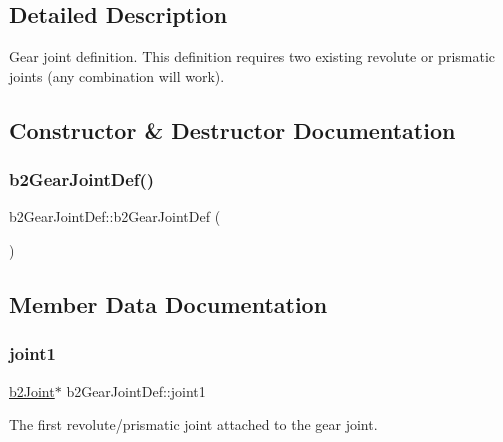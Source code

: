 \subsection{Detailed Description}
Gear joint definition. This definition requires two existing revolute or prismatic joints (any combination will work). 

\subsection{Constructor \& Destructor Documentation}
\mbox{\label{structb2_gear_joint_def_a2e9309a9065ff59704a09b198e57c876}} 
\subsubsection{\texorpdfstring{b2GearJointDef()}{b2GearJointDef()}}
{\footnotesize\ttfamily b2\+Gear\+Joint\+Def\+::b2\+Gear\+Joint\+Def (\begin{DoxyParamCaption}{ }\end{DoxyParamCaption})\hspace{0.3cm}{\ttfamily [inline]}}



\subsection{Member Data Documentation}
\mbox{\label{structb2_gear_joint_def_ae42d33b54291a9e256f3810926883473}} 
\subsubsection{\texorpdfstring{joint1}{joint1}}
{\footnotesize\ttfamily \mbox{\hyperlink{classb2_joint}{b2\+Joint}}$\ast$ b2\+Gear\+Joint\+Def\+::joint1}



The first revolute/prismatic joint attached to the gear joint. 

\mbox{\label{structb2_gear_joint_def_a73cf056fe40e63355073a01b097f4c82}} 
